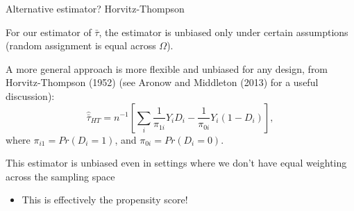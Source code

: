 \documentclass[notes,11pt, aspectratio=169]{beamer}
\newenvironment{wideitemize}{\itemize\addtolength{\itemsep}{10pt}}{\enditemize}
\begin{document}
\begin{frame}{Alternative estimator? Horvitz-Thompson}
  \begin{wideitemize}
  \item For our estimator of $\bar{\tau}$, the estimator is unbiased
    only under certain assumptions (random assignment is equal across
    $\Omega$).
  \item A more general approach is more flexible and unbiased for any
    design, from Horvitz-Thompson (1952) (see Aronow and Middleton
    (2013) for a useful discussion):
    \begin{equation}
      \hat{\bar{\tau}}_{HT} = n^{-1}\left[\sum_{i}\frac{1}{\pi_{1i}}Y_{i}D_{i} - \frac{1}{\pi_{0i}}Y_{i}(1-D_{i})\right],
    \end{equation}
    where $\pi_{i1} = Pr(D_{i} = 1)$, and $\pi_{0i} = Pr(D_{i} = 0)$.
  \item This estimator is unbiased even in settings where we don't have equal
    weighting across the sampling space
    \begin{itemize}
    \item This is effectively the propensity score!
    \end{itemize}
  \end{wideitemize}
\end{frame}
\end{document}
